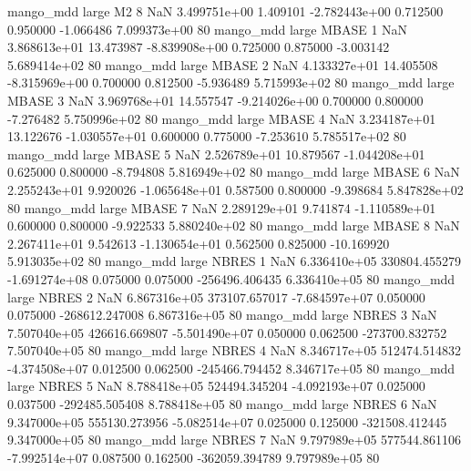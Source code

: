         mango_mdd      large       M2                 8                  NaN 3.499751e+00      1.409101 -2.782443e+00 0.712500 0.950000      -1.066486 7.099373e+00 80
        mango_mdd      large    MBASE                 1                  NaN 3.868613e+01     13.473987 -8.839908e+00 0.725000 0.875000      -3.003142 5.689414e+02 80
        mango_mdd      large    MBASE                 2                  NaN 4.133327e+01     14.405508 -8.315969e+00 0.700000 0.812500      -5.936489 5.715993e+02 80
        mango_mdd      large    MBASE                 3                  NaN 3.969768e+01     14.557547 -9.214026e+00 0.700000 0.800000      -7.276482 5.750996e+02 80
        mango_mdd      large    MBASE                 4                  NaN 3.234187e+01     13.122676 -1.030557e+01 0.600000 0.775000      -7.253610 5.785517e+02 80
        mango_mdd      large    MBASE                 5                  NaN 2.526789e+01     10.879567 -1.044208e+01 0.625000 0.800000      -8.794808 5.816949e+02 80
        mango_mdd      large    MBASE                 6                  NaN 2.255243e+01      9.920026 -1.065648e+01 0.587500 0.800000      -9.398684 5.847828e+02 80
        mango_mdd      large    MBASE                 7                  NaN 2.289129e+01      9.741874 -1.110589e+01 0.600000 0.800000      -9.922533 5.880240e+02 80
        mango_mdd      large    MBASE                 8                  NaN 2.267411e+01      9.542613 -1.130654e+01 0.562500 0.825000     -10.169920 5.913035e+02 80
        mango_mdd      large    NBRES                 1                  NaN 6.336410e+05 330804.455279 -1.691274e+08 0.075000 0.075000 -256496.406435 6.336410e+05 80
        mango_mdd      large    NBRES                 2                  NaN 6.867316e+05 373107.657017 -7.684597e+07 0.050000 0.075000 -268612.247008 6.867316e+05 80
        mango_mdd      large    NBRES                 3                  NaN 7.507040e+05 426616.669807 -5.501490e+07 0.050000 0.062500 -273700.832752 7.507040e+05 80
        mango_mdd      large    NBRES                 4                  NaN 8.346717e+05 512474.514832 -4.374508e+07 0.012500 0.062500 -245466.794452 8.346717e+05 80
        mango_mdd      large    NBRES                 5                  NaN 8.788418e+05 524494.345204 -4.092193e+07 0.025000 0.037500 -292485.505408 8.788418e+05 80
        mango_mdd      large    NBRES                 6                  NaN 9.347000e+05 555130.273956 -5.082514e+07 0.025000 0.125000 -321508.412445 9.347000e+05 80
        mango_mdd      large    NBRES                 7                  NaN 9.797989e+05 577544.861106 -7.992514e+07 0.087500 0.162500 -362059.394789 9.797989e+05 80
